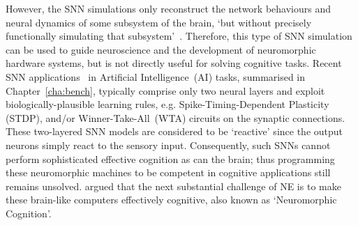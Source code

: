 \documentclass[10pt,journal,compsoc]{IEEEtran}
\begin{document}
However, the SNN simulations only reconstruct the network behaviours and neural dynamics of some subsystem of the brain, `but without precisely functionally simulating that subsystem'~\cite{de2010world}.
Therefore, this type of SNN simulation can be used to guide neuroscience and the development of neuromorphic hardware systems, but is not directly useful for solving cognitive tasks.
Recent SNN applications~\cite{bill2014compound,diehl2015unsupervised} in Artificial Intelligence~(AI) tasks, summarised in Chapter~\ref{cha:bench}, typically comprise only two neural layers and exploit biologically-plausible learning rules, e.g. Spike-Timing-Dependent Plasticity (STDP), and/or Winner-Take-All~(WTA) circuits on the synaptic connections.
These two-layered SNN models are considered to be `reactive' since the output neurons simply react to the sensory input.
Consequently, such SNNs cannot perform sophisticated effective cognition as can the brain;
thus programming these neuromorphic machines to be competent in cognitive applications still remains unsolved.
\cite{indiveri2009artificial} argued that the next substantial challenge of NE is to make these brain-like computers effectively cognitive, also known as `Neuromorphic Cognition'.


%
%
\end{document}

